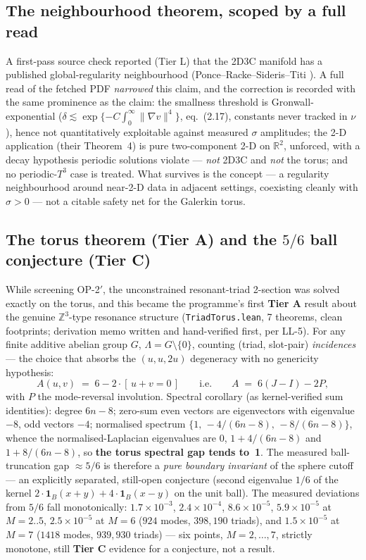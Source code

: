 \documentclass[11pt,a4paper]{article}
\newcommand{\tA}{\textcolor{TierA}{\textbf{Tier A}}}
\newcommand{\tC}{\textcolor{TierC}{\textbf{Tier C}}}
\newcommand{\tL}{\textsf{Tier L}}
\newcommand{\Z}{\mathbb{Z}}
\newcommand{\R}{\mathbb{R}}
\theoremstyle{definition}
\theoremstyle{plain}
\begin{document}
\subsection{The neighbourhood theorem, scoped by a full read}

A first-pass source check reported (\tL{}) that the 2D3C manifold has a published
global-regularity neighbourhood (Ponce--Racke--Sideris--Titi
\cite{ponce-racke-sideris-titi}).
A full read of the fetched PDF \emph{narrowed} this claim, and the correction is recorded with
the same prominence as the claim: the smallness threshold is Gronwall-exponential
($\delta\lesssim\exp\{-C\int_0^\infty\|\nabla v\|^4\}$, eq.~(2.17), constants never tracked in
$\nu$), hence not quantitatively exploitable against measured $\sigma$ amplitudes; the 2-D
application (their Theorem~4) is pure two-component 2-D on $\R^2$, unforced, with a decay
hypothesis periodic solutions violate --- \emph{not} 2D3C and \emph{not} the torus; and no
periodic-$T^3$ case is treated. What survives is the concept --- a regularity neighbourhood
around near-2-D data in adjacent settings, coexisting cleanly with $\sigma>0$ --- not a
citable safety net for the Galerkin torus.

\subsection{The torus theorem (\tA{}) and the $5/6$ ball conjecture (\tC{})}

While screening OP-2$'$, the unconstrained resonant-triad 2-section was solved exactly on the
torus, and this became the programme's first \tA{} result about the genuine $\Z^3$-type
resonance structure (\texttt{TriadTorus.lean}, 7 theorems, clean footprints; derivation memo
written and hand-verified first, per LL-5). For any finite additive abelian group $G$,
$\Lambda=G\setminus\{0\}$, counting (triad, slot-pair) \emph{incidences} --- the choice that
absorbs the $(u,u,2u)$ degeneracy with no genericity hypothesis:
\[
A(u,v) \;=\; 6 - 2\cdot[\,u+v=0\,] \qquad\text{i.e.}\qquad A \;=\; 6(J-I) - 2P,
\]
with $P$ the mode-reversal involution. Spectral corollary (as kernel-verified sum identities):
degree $6n-8$; zero-sum even vectors are eigenvectors with eigenvalue $-8$, odd vectors $-4$;
normalised spectrum $\{1,\,-4/(6n-8),\,-8/(6n-8)\}$, whence the normalised-Laplacian
eigenvalues are $0$, $1+4/(6n-8)$ and $1+8/(6n-8)$, so \textbf{the torus spectral gap tends
to~1}. The measured ball-truncation gap $\approx5/6$ is therefore a \emph{pure boundary
invariant} of the sphere cutoff --- an explicitly separated, still-open conjecture
(second eigenvalue $1/6$ of the kernel $2\cdot\mathbf{1}_B(x+y)+4\cdot\mathbf{1}_B(x-y)$ on
the unit ball). The measured deviations from $5/6$ fall monotonically:
$1.7\times10^{-3}$, $2.4\times10^{-4}$, $8.6\times10^{-5}$, $5.9\times10^{-5}$ at $M=2..5$,
$2.5\times10^{-5}$ at $M=6$ ($924$ modes, $398{,}190$ triads), and $1.5\times10^{-5}$ at
$M=7$ ($1418$ modes, $939{,}930$ triads) --- six points, $M=2,\dots,7$, strictly monotone,
still \tC{} evidence for a conjecture, not a result.
\end{document}
